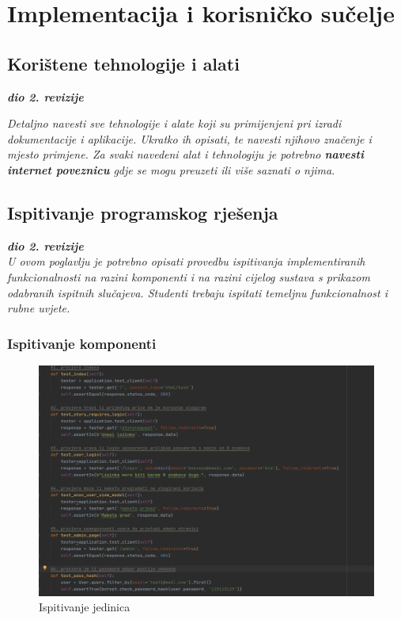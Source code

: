 \chapter{Implementacija i korisničko sučelje}
		
		
		\section{Korištene tehnologije i alati}
		
			\textbf{\textit{dio 2. revizije}}
			
			 \textit{Detaljno navesti sve tehnologije i alate koji su primijenjeni pri izradi dokumentacije i aplikacije. Ukratko ih opisati, te navesti njihovo značenje i mjesto primjene. Za svaki navedeni alat i tehnologiju je potrebno \textbf{navesti internet poveznicu} gdje se mogu preuzeti ili više saznati o njima}.
			
			
			\eject 
		
	
		\section{Ispitivanje programskog rješenja}
			
			\textbf{\textit{dio 2. revizije}}\\
			
			 \textit{U ovom poglavlju je potrebno opisati provedbu ispitivanja implementiranih funkcionalnosti na razini komponenti i na razini cijelog sustava s prikazom odabranih ispitnih slučajeva. Studenti trebaju ispitati temeljnu funkcionalnost i rubne uvjete.}
	
			
			\subsection{Ispitivanje komponenti}
			
			\begin{figure}[H]
				\includegraphics[width=1\linewidth]{slike/unit_tests.PNG} %
				\caption{Ispitivanje jedinica}
				\label{fig:unit1} %
			\end{figure}
		
